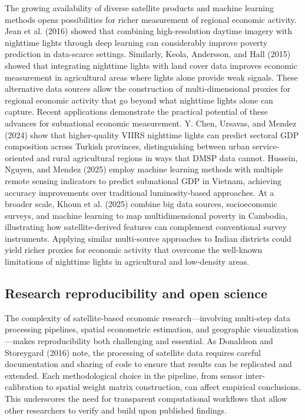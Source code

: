 \documentclass[
  letterpaper,
  DIV=11,
  numbers=noendperiod]{scrartcl}
\begin{document}
The growing availability of diverse satellite products and machine
learning methods opens possibilities for richer measurement of regional
economic activity. Jean et al. (2016) showed that combining
high-resolution daytime imagery with nighttime lights through deep
learning can considerably improve poverty prediction in data-scarce
settings. Similarly, Keola, Andersson, and Hall (2015) showed that
integrating nighttime lights with land cover data improves economic
measurement in agricultural areas where lights alone provide weak
signals. These alternative data sources allow the construction of
multi-dimensional proxies for regional economic activity that go beyond
what nighttime lights alone can capture. Recent applications demonstrate
the practical potential of these advances for subnational economic
measurement. Y. Chen, Ursavas, and Mendez (2024) show that
higher-quality VIIRS nighttime lights can predict sectoral GDP
composition across Turkish provinces, distinguishing between urban
service-oriented and rural agricultural regions in ways that DMSP data
cannot. Hussein, Nguyen, and Mendez (2025) employ machine learning
methods with multiple remote sensing indicators to predict subnational
GDP in Vietnam, achieving accuracy improvements over traditional
luminosity-based approaches. At a broader scale, Khoun et al. (2025)
combine big data sources, socioeconomic surveys, and machine learning to
map multidimensional poverty in Cambodia, illustrating how
satellite-derived features can complement conventional survey
instruments. Applying similar multi-source approaches to Indian
districts could yield richer proxies for economic activity that overcome
the well-known limitations of nighttime lights in agricultural and
low-density areas.

\subsection{Research reproducibility and open
science}\label{research-reproducibility-and-open-science}

The complexity of satellite-based economic research---involving
multi-step data processing pipelines, spatial econometric estimation,
and geographic visualization---makes reproducibility both challenging
and essential. As Donaldson and Storeygard (2016) note, the processing
of satellite data requires careful documentation and sharing of code to
ensure that results can be replicated and extended. Each methodological
choice in the pipeline, from sensor inter-calibration to spatial weight
matrix construction, can affect empirical conclusions. This underscores
the need for transparent computational workflows that allow other
researchers to verify and build upon published findings.
\end{document}
